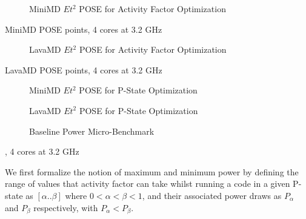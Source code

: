 \begin{figure}
\centering

\caption{MiniMD $Et^2$ POSE for Activity Factor Optimization}
\label{fig:minimd}
\end{figure}

\begin{table}
\centering

\caption{MiniMD POSE points, 4 cores at 3.2 GHz}
\label{tab:minimd_pose}
\end{table} 


\begin{figure}
\centering

\caption{LavaMD $Et^2$ POSE for Activity Factor Optimization}
\label{fig:lavamd}
\end{figure}

\begin{table}
\centering

\caption{LavaMD POSE points, 4 cores at 3.2 GHz}
\label{tab:lavamd_pose}
\end{table} 

\begin{figure}
\centering

\caption{MiniMD $Et^2$ POSE for P-State Optimization}
\label{fig:minimd-pstates}
\end{figure}


\begin{figure}
\centering

\caption{LavaMD $Et^2$ POSE for P-State Optimization}
\label{fig:lavamd-pstates}
\end{figure}


\begin{figure}[ht]                                                               
\centering                                                                      
\lstset{basicstyle=\ttfamily\footnotesize\bfseries, frame=tb} %
              
\caption{Baseline Power Micro-Benchmark}                            
\label{fig:microbench}                                                           
\end{figure}  



\begin{table}
\centering

\caption{, 4 cores at 3.2 GHz}
\end{table} 


We first formalize the notion of maximum and minimum power by defining the range of values that activity factor can take whilst running a code in a given P-state as $[\alpha  .. \beta]$ where $0 < \alpha < \beta < 1$, and their associated power draws as $P_{\alpha}$ and $P_{\beta}$ respectively, with $P_{\alpha} < P_{\beta}$. 


